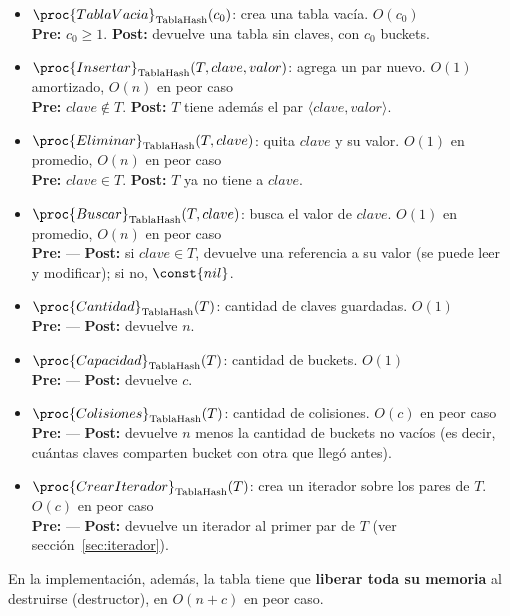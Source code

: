 \documentclass{article}
\newcommand{\OP}[2]{\proc{#1}_{\text{#2}}}
\begin{document}
\begin{itemize}
\item $\OP{TablaVacia}{TablaHash}(c_0)$: crea una tabla vacía. \hfill $O(c_0)$ \\
  {\footnotesize \textbf{Pre:} $c_0 \geq 1$. \quad \textbf{Post:} devuelve una tabla sin claves, con $c_0$ buckets.}
\item $\OP{Insertar}{TablaHash}(T, clave, valor)$: agrega un par nuevo. \hfill $O(1)$ amortizado, $O(n)$ en peor caso \\
  {\footnotesize \textbf{Pre:} $clave \notin T$. \quad \textbf{Post:} $T$ tiene además el par $\langle clave, valor \rangle$.}
\item $\OP{Eliminar}{TablaHash}(T, clave)$: quita $clave$ y su valor. \hfill $O(1)$ en promedio, $O(n)$ en peor caso \\
  {\footnotesize \textbf{Pre:} $clave \in T$. \quad \textbf{Post:} $T$ ya no tiene a $clave$.}
\item $\OP{Buscar}{TablaHash}(T, clave)$: busca el valor de $clave$. \hfill $O(1)$ en promedio, $O(n)$ en peor caso \\
  {\footnotesize \textbf{Pre:} --- \quad \textbf{Post:} si $clave \in T$, devuelve una referencia a su valor (se puede leer y modificar); si no, $\const{nil}$.}
\item $\OP{Cantidad}{TablaHash}(T)$: cantidad de claves guardadas. \hfill $O(1)$ \\
  {\footnotesize \textbf{Pre:} --- \quad \textbf{Post:} devuelve $n$.}
\item $\OP{Capacidad}{TablaHash}(T)$: cantidad de buckets. \hfill $O(1)$ \\
  {\footnotesize \textbf{Pre:} --- \quad \textbf{Post:} devuelve $c$.}
\item $\OP{Colisiones}{TablaHash}(T)$: cantidad de colisiones. \hfill $O(c)$ en peor caso \\
  {\footnotesize \textbf{Pre:} --- \quad \textbf{Post:} devuelve $n$ menos la cantidad de buckets no vacíos (es decir, cuántas claves comparten bucket con otra que llegó antes).}
\item $\OP{CrearIterador}{TablaHash}(T)$: crea un iterador sobre los pares de $T$. \hfill $O(c)$ en peor caso \\
  {\footnotesize \textbf{Pre:} --- \quad \textbf{Post:} devuelve un iterador al primer par de $T$ (ver sección~\ref{sec:iterador}).}
\end{itemize}

En la implementación, además, la tabla tiene que \textbf{liberar toda su memoria} al destruirse (destructor), en $O(n + c)$ en peor caso.
\end{document}
